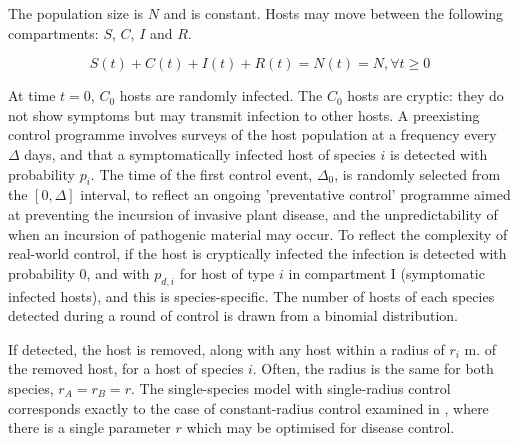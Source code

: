 \documentclass[prstpaper]{revtex4-2}
\begin{document}
% 



The population size is $N$ and is constant. Hosts may move between the following compartments: $S$, $C$, $I$ and $R$.

\begin{equation}
	S(t) + C(t) + I(t) + R(t) = N(t) = N,   \forall t \ge 0 
\end{equation}

At time $t = 0$, $C_0$ hosts are randomly infected. The $C_{0}$ hosts are cryptic: they do not show symptoms but may transmit infection to other hosts. A preexisting control programme involves surveys of the host population at a frequency every $\Delta$ days, and that a symptomatically infected host of species $i$ is detected with probability $p_i$. The time of the first control event, $\Delta_{0}$, is randomly selected from the  $[0, \Delta]$ interval, to reflect an ongoing 'preventative control' programme aimed at preventing the incursion of invasive plant disease, and the unpredictability of when an incursion of pathogenic material may occur. To reflect the complexity of real-world control, if the host is cryptically infected the infection is detected with probability 0, and with $p_{d, i}$ for host of type $i$ in compartment I (symptomatic infected hosts), and this is species-specific. The number of hosts of each species detected during a round of control is drawn from a binomial distribution.

If detected, the host is removed, along with any host within a radius of $r_{i}$ m. of the removed host, for a host of species $i$. Often, the radius is the same for both species, $r_{A} = r_{B} = r$.
The single-species model with single-radius control corresponds exactly to the case of constant-radius control examined in \cite{HyattTwynam2017}, where there is a single parameter $r$ which may be optimised for disease control.
\end{document}
